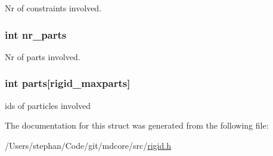 Nr of constraints involved. \hypertarget{structrigid_ac4dd7e5fa976280ea5c88ef8206c2d5b}{
\subsubsection[{nr\-\_\-parts}]{\setlength{\rightskip}{0pt plus 5cm}int nr\-\_\-parts}}\label{structrigid_ac4dd7e5fa976280ea5c88ef8206c2d5b}
Nr of parts involved. \hypertarget{structrigid_a764d5dc0a8072ed017809e7820ae62a2}{
\subsubsection[{parts}]{\setlength{\rightskip}{0pt plus 5cm}int parts\mbox{[}{\bf rigid\-\_\-maxparts}\mbox{]}}}\label{structrigid_a764d5dc0a8072ed017809e7820ae62a2}
ids of particles involved 

The documentation for this struct was generated from the following file\-:\begin{DoxyCompactItemize}
\item 
/\-Users/stephan/\-Code/git/mdcore/src/\hyperlink{rigid_8h}{rigid.\-h}\end{DoxyCompactItemize}
